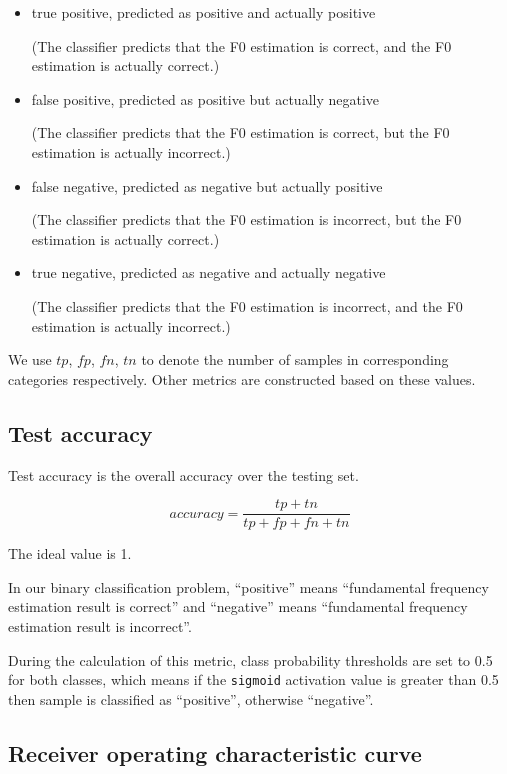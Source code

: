\documentclass[11pt,a4paper]{report}
\begin{document}
\begin{itemize}
  \item true positive, predicted as positive and actually positive

    (The classifier predicts that the F0 estimation is correct, and the F0 estimation is actually correct.)
  \item false positive, predicted as positive but actually negative

    (The classifier predicts that the F0 estimation is correct, but the F0 estimation is actually incorrect.)
  \item false negative, predicted as negative but actually positive

    (The classifier predicts that the F0 estimation is incorrect, but the F0 estimation is actually correct.)
  \item true negative, predicted as negative and actually negative

    (The classifier predicts that the F0 estimation is incorrect, and the F0 estimation is actually incorrect.)
\end{itemize}

We use \(tp\), \(fp\), \(fn\), \(tn\) to denote the number of samples in corresponding categories respectively.
Other metrics are constructed based on these values.

\subsection{Test accuracy}

Test accuracy is the overall accuracy over the testing set.

\begin{equation*}
  accuracy = \frac{tp+tn}{tp+fp+fn+tn}
\end{equation*}

The ideal value is 1.

In our binary classification problem, \enquote{positive} means \enquote{fundamental frequency estimation result is correct} and \enquote{negative} means \enquote{fundamental frequency estimation result is incorrect}.

During the calculation of this metric, class probability thresholds are set to 0.5 for both classes, which means if the \texttt{sigmoid} activation value is greater than 0.5 then sample is classified as \enquote{positive}, otherwise \enquote{negative}.

\subsection{Receiver operating characteristic curve}
\end{document}
